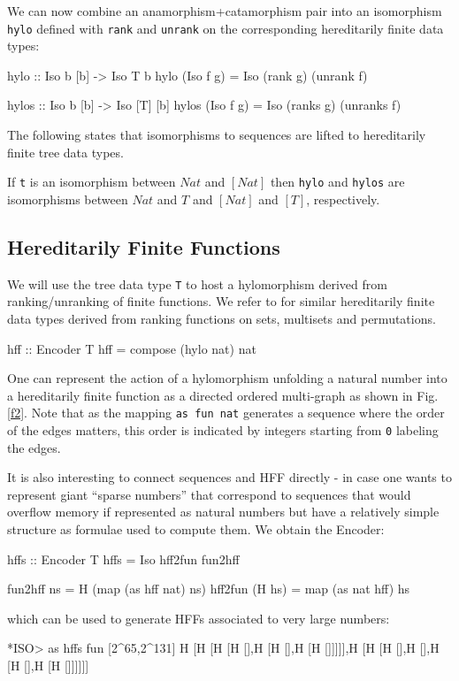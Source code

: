 \documentclass[]{INCLUDES/llncs}
\begin{document}
We can now combine an 
anamorphism+catamorphism pair into
an isomorphism {\tt hylo} defined
with {\tt rank} and {\tt unrank} 
on the corresponding
hereditarily finite data types:
\begin{code}
hylo :: Iso b [b] -> Iso T b
hylo (Iso f g) = Iso (rank g) (unrank f)

hylos :: Iso b [b] -> Iso [T] [b]
hylos (Iso f g) = Iso (ranks g) (unranks f)
\end{code}
The following states that isomorphisms to sequences are lifted to hereditarily
finite tree data types.
\begin{prop}
If {\tt t} is an isomorphism between $Nat$ and $[Nat]$ then {\tt hylo} and
{\tt hylos} are isomorphisms between $Nat$ and $T$ and $[Nat]$ and $[T]$,
respectively.
\end{prop}

\subsection{Hereditarily Finite Functions}
We will use the tree data type {\tt T} to host a hylomorphism
derived from ranking/unranking of finite functions. We refer to
\cite{arxiv:fISO} for similar hereditarily finite data types derived from
ranking functions on sets, multisets and permutations.
\begin{code}
hff :: Encoder T
hff = compose (hylo nat) nat
\end{code}
One can represent the action of a hylomorphism unfolding a natural number into
a hereditarily finite function as a directed ordered multi-graph as shown
in Fig. \ref{f2}. Note that as the mapping {\tt as fun nat} generates
a sequence where the order of the edges matters, this order is
indicated by integers starting from {\tt 0} labeling the edges.

It is also interesting to connect sequences and HFF directly - in case one
wants to represent giant ``sparse numbers'' that correspond to sequences
that would overflow memory if represented as natural numbers but have a
relatively simple structure as formulae used to compute them. We obtain the
Encoder:
\begin{code}
hffs :: Encoder T
hffs = Iso hff2fun fun2hff

fun2hff ns = H (map (as hff nat) ns)
hff2fun (H hs) = map (as nat hff) hs
\end{code}
which can be used to generate HFFs associated to very large numbers:
\begin{codex}
*ISO> as hffs fun [2^65,2^131]
H [H [H [H [],H [H [],H [H []]]]],H [H [H [],H [],H [H [],H [H []]]]]]
\end{codex}
\end{document}
